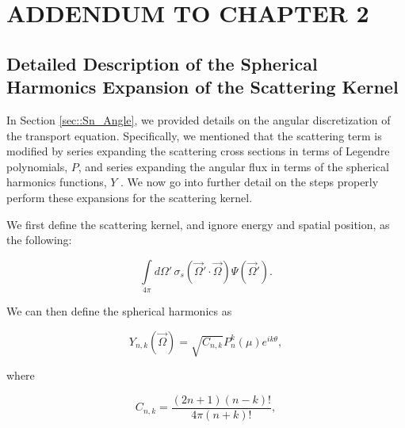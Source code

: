 %
%
%

\chapter{\uppercase{Addendum to Chapter 2}}
\label{sec::appendix_SN}

\section{Detailed Description of the Spherical Harmonics Expansion of the Scattering Kernel}
\label{sec::appendix_SN_Scattering}

In Section \ref{sec::Sn_Angle}, we provided details on the angular discretization of the transport equation. Specifically, we mentioned that the scattering term is modified by series expanding the scattering cross sections in terms of Legendre polynomials, $P$, and series expanding the angular flux in terms of the spherical harmonics functions, $Y$ . We now go into further detail on the steps properly perform these expansions for the scattering kernel.

We first define the scattering kernel, and ignore energy and spatial position, as the following:

\begin{equation}
\label{eq::App_SN_scatt_kernel}
\int\limits_{4 \pi} d \Omega' \, \sigma_s (\vec{\Omega}' \cdot \vec{\Omega}) \Psi (\vec{\Omega}') .
\end{equation}

\noindent We can then define the spherical harmonics as

\begin{equation}
\label{eq::App_SN_sph_harm_funcs}
Y_{n,k} (\vec{\Omega}) = \sqrt{C_{n,k}} P_n^k (\mu) e^{i k \theta} ,
\end{equation}

\noindent where

\begin{equation}
\label{eq::App_SN_sph_harm_consts}
C_{n,k} = \frac{(2n +1)(n-k)!}{4 \pi (n+k) !} ,
\end{equation}

